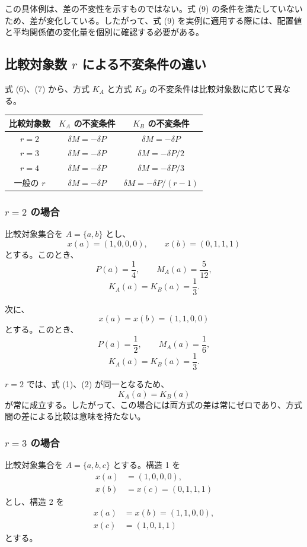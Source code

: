 \documentclass[a4paper,11pt]{ltjsarticle}
\begin{document}
この具体例は、差の不変性を示すものではない。式 (9) の条件を満たしていないため、差が変化している。したがって、式 (9) を実例に適用する際には、配置値と平均関係値の変化量を個別に確認する必要がある。

\subsection{比較対象数 $r$ による不変条件の違い}

式 (6)、(7) から、方式 $K_A$ と方式 $K_B$ の不変条件は比較対象数に応じて異なる。

\begin{center}
\begin{tabular}{c|c|c}
\hline
比較対象数 & $K_A$ の不変条件 & $K_B$ の不変条件\\
\hline
$r=2$ & $\delta M=-\delta P$
      & $\delta M=-\delta P$\\
$r=3$ & $\delta M=-\delta P$
      & $\delta M=-\delta P/2$\\
$r=4$ & $\delta M=-\delta P$
      & $\delta M=-\delta P/3$\\
一般の $r$ & $\delta M=-\delta P$
            & $\delta M=-\delta P/(r-1)$\\
\hline
\end{tabular}
\end{center}

\subsubsection{$r=2$ の場合}

比較対象集合を $A=\{a,b\}$ とし、
\[
x(a)=(1,0,0,0),\qquad
x(b)=(0,1,1,1)
\]
とする。このとき、
\[
P(a)=\frac14,\qquad
M_A(a)=\frac5{12},
\]
\[
K_A(a)=K_B(a)=\frac13.
\]

次に、
\[
x(a)=x(b)=(1,1,0,0)
\]
とする。このとき、
\[
P(a)=\frac12,\qquad
M_A(a)=\frac16,
\]
\[
K_A(a)=K_B(a)=\frac13.
\]

$r=2$ では、式 (1)、(2) が同一となるため、
\[
K_A(a)=K_B(a)
\]
が常に成立する。したがって、この場合には両方式の差は常にゼロであり、方式間の差による比較は意味を持たない。

\subsubsection{$r=3$ の場合}

比較対象集合を $A=\{a,b,c\}$ とする。構造 1 を
\[
\begin{aligned}
x(a)&=(1,0,0,0),\\
x(b)&=x(c)=(0,1,1,1)
\end{aligned}
\]
とし、構造 2 を
\[
\begin{aligned}
x(a)&=x(b)=(1,1,0,0),\\
x(c)&=(1,0,1,1)
\end{aligned}
\]
とする。
\end{document}
